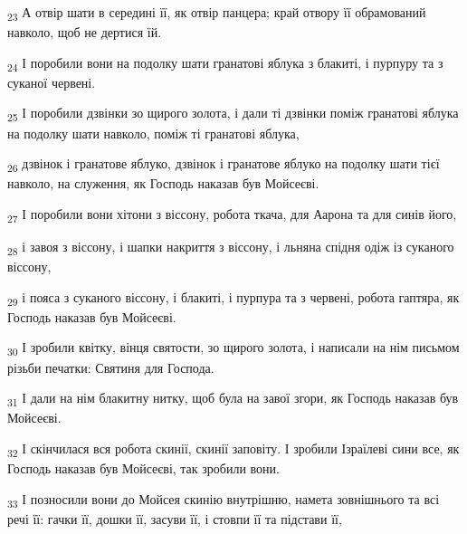 \begin{tcolorbox}
\textsubscript{23} А отвір шати в середині її, як отвір панцера; край отвору її обрамований навколо, щоб не дертися їй.
\end{tcolorbox}
\begin{tcolorbox}
\textsubscript{24} І поробили вони на подолку шати гранатові яблука з блакиті, і пурпуру та з суканої червені.
\end{tcolorbox}
\begin{tcolorbox}
\textsubscript{25} І поробили дзвінки зо щирого золота, і дали ті дзвінки поміж гранатові яблука на подолку шати навколо, поміж ті гранатові яблука,
\end{tcolorbox}
\begin{tcolorbox}
\textsubscript{26} дзвінок і гранатове яблуко, дзвінок і гранатове яблуко на подолку шати тієї навколо, на служення, як Господь наказав був Мойсеєві.
\end{tcolorbox}
\begin{tcolorbox}
\textsubscript{27} І поробили вони хітони з віссону, робота ткача, для Аарона та для синів його,
\end{tcolorbox}
\begin{tcolorbox}
\textsubscript{28} і завоя з віссону, і шапки накриття з віссону, і льняна спідня одіж із суканого віссону,
\end{tcolorbox}
\begin{tcolorbox}
\textsubscript{29} і пояса з суканого віссону, і блакиті, і пурпура та з червені, робота гаптяра, як Господь наказав був Мойсеєві.
\end{tcolorbox}
\begin{tcolorbox}
\textsubscript{30} І зробили квітку, вінця святости, зо щирого золота, і написали на нім письмом різьби печатки: Святиня для Господа.
\end{tcolorbox}
\begin{tcolorbox}
\textsubscript{31} І дали на нім блакитну нитку, щоб була на завої згори, як Господь наказав був Мойсеєві.
\end{tcolorbox}
\begin{tcolorbox}
\textsubscript{32} І скінчилася вся робота скинії, скинії заповіту. І зробили Ізраїлеві сини все, як Господь наказав був Мойсеєві, так зробили вони.
\end{tcolorbox}
\begin{tcolorbox}
\textsubscript{33} І позносили вони до Мойсея скинію внутрішню, намета зовнішнього та всі речі її: гачки її, дошки її, засуви її, і стовпи її та підстави її,
\end{tcolorbox}
